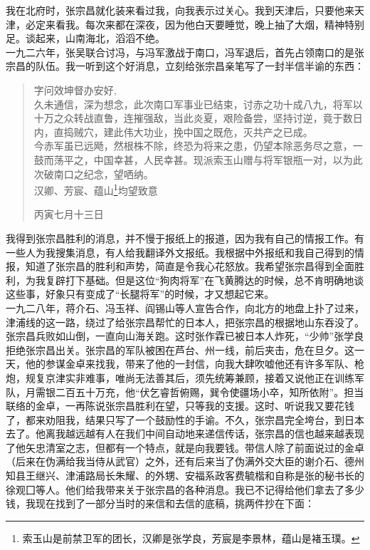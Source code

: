 我在北府时，张宗昌就化装来看过我，向我表示过关心。我到天津后，只要他来天津，必定来看我。每次来都在深夜，因为他白天要睡觉，晚上抽了大烟，精神特别足。谈起来，山南海北，滔滔不绝。\\

一九二六年，张吴联合讨冯，与冯军激战于南口，冯军退后，首先占领南口的是张宗昌的队伍。我一听到这个好消息，立刻给张宗昌亲笔写了一封半信半谕的东西：\\

\begin{quote}
	字问效坤督办安好,\\

久未通信，深为想念，此次南口军事业已结束，讨赤之功十成八九，将军以十万之众转战直鲁，连摧强敌，当此炎夏，艰险备尝，坚持讨逆，竟于数日内，直捣贼穴，建此伟大功业，挽中国之既危，灭共产之已成。\\

今赤军虽已远飏，然根株不除，终恐为将来之患，仍望本除恶务尽之意，一鼓而荡平之，中国幸甚，人民幸甚。现派索玉山赠与将军银瓶一对，以为此次破南口之纪念，望哂纳。\\

汉卿、芳宸、蕴山\footnote{索玉山是前禁卫军的团长，汉卿是张学良，芳宸是李景林，蕴山是褚玉璞。}均望致意\\

\begin{flushright}
	丙寅七月十三日\\
\end{flushright}
\end{quote}

我得到张宗昌胜利的消息，并不慢于报纸上的报道，因为我有自己的情报工作。有一些人为我搜集消息，有人给我翻译外文报纸。我根据中外报纸和我自己得到的情报，知道了张宗昌的胜利和声势，简直是令我心花怒放。我希望张宗昌得到全面胜利，为我复辟打下基础。但是这位“狗肉将军”在飞黄腾达的时候，总不肯明确地谈这些事，好象只有变成了“长腿将军”的时候，才又想起它来。\\

一九二八年，蒋介石、冯玉祥、阎锡山等人宣告合作，向北方的地盘上扑了过来，津浦线的这一路，绕过了给张宗昌帮忙的日本人，把张宗昌的根据地山东吞没了。张宗昌兵败如山倒，一直向山海关跑。这时张作霖已被日本人炸死，“少帅”张学良拒绝张宗昌出关。张宗昌的军队被困在芦台、州一线，前后夹击，危在旦夕。这一天，他的参谋金卓来找我，带来了他的一封信，向我大肆吹嘘他还有许多军队、枪炮，规复京津实非难事，唯尚无法善其后，须先统筹兼顾，接着又说他正在训练军队，月需银二百五十万充，他“伏乞睿哲俯赐，巽令使疆场小卒，知所依附”。担当联络的金卓，一再陈说张宗昌胜利在望，只等我的支援。这时、听说我又要花钱了，都来劝阻我，结果只写了一个鼓励性的手谕。不久，张宗昌完全垮台，到日本去了。他离我越远越有人在我们中间自动地来递信传话，张宗昌的信也越来越表现了他矢忠清室之志，但都有一个特点，就是向我要钱。带信人除了前面说过的金卓（后来在伪满给我当侍从武官）之外，还有后来当了伪满外交大臣的谢介石、德州知县王继兴、津浦路局长朱耀、的外甥、安福系政客费毓楷和自称是张的秘书长的徐观囗等人。他们给我带来关于张宗昌的各种消息。我已不记得给他们拿去了多少钱，我现在找到了一部分当时的来信和去信的底稿，挑两件抄在下面：\\

